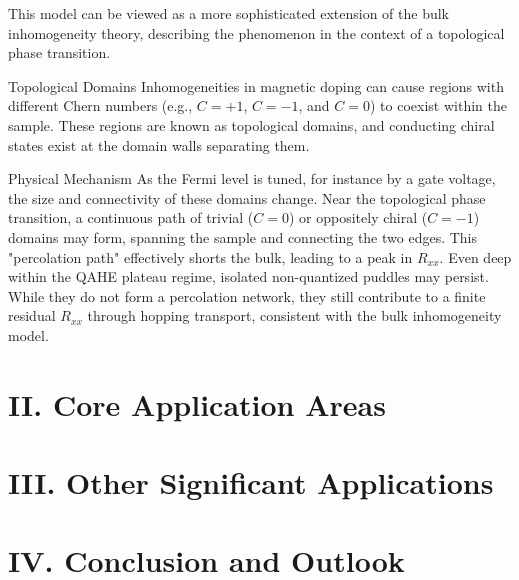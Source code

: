\documentclass[aps,prl,reprint,groupedaddress]{revtex4-2}
\begin{document}
This model can be viewed as a more sophisticated extension of the bulk inhomogeneity theory, describing the phenomenon in the context of a topological phase transition.

Topological Domains Inhomogeneities in magnetic doping can cause regions with different Chern numbers (e.g., $C=+1$, $C=-1$, and $C=0$) to coexist within the sample. These regions are known as topological domains, and conducting chiral states exist at the domain walls separating them.

Physical Mechanism As the Fermi level is tuned, for instance by a gate voltage, the size and connectivity of these domains change. Near the topological phase transition, a continuous path of trivial ($C=0$) or oppositely chiral ($C=-1$) domains may form, spanning the sample and connecting the two edges. This "percolation path" effectively shorts the bulk, leading to a peak in $R_{xx}$. Even deep within the QAHE plateau regime, isolated non-quantized puddles may persist. While they do not form a percolation network, they still contribute to a finite residual $R_{xx}$ through hopping transport, consistent with the bulk inhomogeneity model.




\section{II. Core Application Areas}

\section{III. Other Significant Applications}

\section{IV. Conclusion and Outlook}
\end{document}

